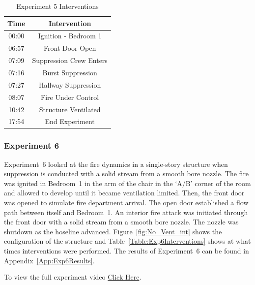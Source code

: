 \documentclass[12pt,oneside]{book}
\begin{document}
\begin{table}[!ht]
	\centering
	\caption{Experiment 5 Interventions}
	\begin{tabular}{|c|c|} 
		\hline
		Time & Intervention \\ \hline \hline
		00:00 & Ignition - Bedroom 1 \\ \hline
		06:57 & Front Door Open \\ \hline
		07:09 & Suppression Crew Enters\\ \hline
		07:16 & Burst Suppression \\ \hline 
		07:27 & Hallway Suppression \\ \hline
		08:07 & Fire Under Control \\ \hline
		10:42 & Structure Ventilated \\ \hline
		17:54 & End Experiment\\ \hline
	\end{tabular}
	\label{Table:Exp5Interventions}
\end{table}

\FloatBarrier
\clearpage

\subsubsection{Experiment 6}
Experiment~6 looked at the fire dynamics in a single-story structure when suppression is conducted with a solid stream from a smooth bore nozzle. The fire was ignited in Bedroom~1 in the arm of the chair in the `A/B' corner of the room and allowed to develop until it became ventilation limited. Then, the front door was opened to simulate fire department arrival. The open door established a flow path between itself and Bedroom~1. An interior fire attack was initiated through the front door with a solid stream from a smooth bore nozzle. The nozzle was shutdown as the hoseline advanced. Figure~\ref{fig:No_Vent_int} shows the configuration of the structure and Table~\ref{Table:Exp6Interventions} shows at what times interventions were performed. The results of Experiment~6 can be found in Appendix~\ref{App:Exp6Results}. 

To view the full experiment video \href{https://player.vimeo.com/video/170510936?autoplay=1}{Click Here}.
\end{document}
